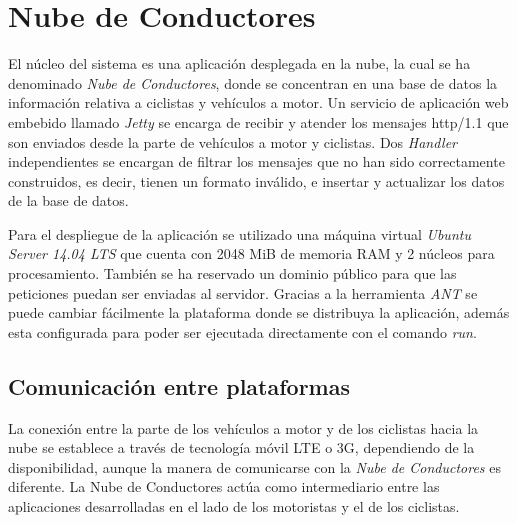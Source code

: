 \section{Nube de Conductores}\label{section:NubeConductores}
El núcleo del sistema es una aplicación desplegada en la nube, la cual se ha denominado \emph{Nube de Conductores}, donde se concentran en una base de datos la información relativa a ciclistas y vehículos a motor. Un servicio de aplicación web embebido llamado \emph{Jetty} se encarga de recibir y atender los mensajes \Gls{http/1.1} que son enviados desde la parte de vehículos a motor y ciclistas. Dos \emph{Handler} independientes se encargan de filtrar los mensajes que no han sido correctamente construidos, es decir, tienen un formato inválido, e insertar y actualizar los datos de la base de datos.

Para el despliegue de la aplicación se utilizado una máquina virtual \emph{Ubuntu Server 14.04 LTS} que cuenta con 2048 MiB de memoria RAM y 2 n\'ucleos para procesamiento. También se ha reservado un dominio público para que las peticiones puedan ser enviadas al servidor. Gracias a la herramienta \emph{ANT} se puede cambiar fácilmente la plataforma donde se distribuya la aplicación, además esta configurada para poder ser ejecutada directamente con el comando \emph{run}.


\subsection{Comunicación entre plataformas}\label{ssection:comunicacion_plataformas}
La conexión entre la parte de los vehículos a motor y de los ciclistas hacia la nube se establece a través de tecnología móvil \gls{LTE} o \gls{3G}, dependiendo de la disponibilidad, aunque la manera de comunicarse con la \emph{Nube de Conductores} es diferente. La Nube de Conductores actúa como intermediario entre las aplicaciones desarrolladas en el lado de los motoristas y el de los ciclistas.

